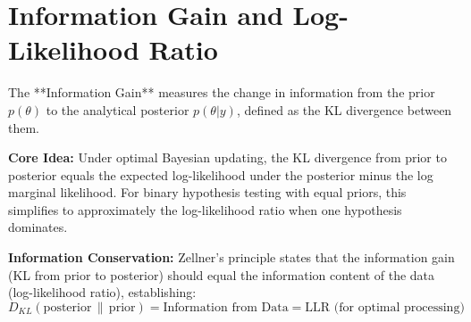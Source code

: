 \documentclass{article}
\theoremstyle{definition}
\begin{document}





\section{Information Gain and Log-Likelihood Ratio}

The **Information Gain** measures the change in information from the prior $p(\theta)$ to the analytical posterior $p(\theta|y)$, defined as the KL divergence between them.


\textbf{Core Idea:} Under optimal Bayesian updating, the KL divergence from prior to posterior equals the expected log-likelihood under the posterior minus the log marginal likelihood. For binary hypothesis testing with equal priors, this simplifies to approximately the log-likelihood ratio when one hypothesis dominates.

\textbf{Information Conservation:} Zellner's principle states that the information gain (KL from prior to posterior) should equal the information content of the data (log-likelihood ratio), establishing:
\begin{equation}
\boxed{D_{KL}(\text{posterior} \,\|\, \text{prior}) = \text{Information from Data} = \text{LLR} \text{ (for optimal processing)}}
\end{equation}
\end{document}
